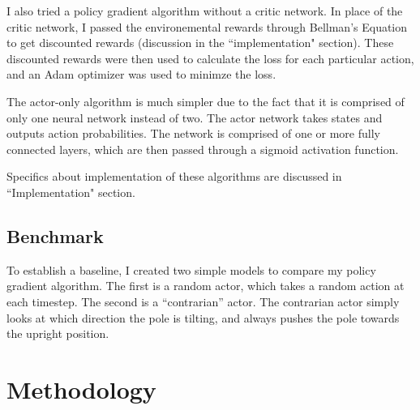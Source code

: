 \documentclass[12pt,a4paper]{article}
\begin{document}
I also tried a policy gradient algorithm without a critic network. In place of the critic network, I passed the environemental rewards through Bellman's Equation to get discounted rewards (discussion in the ``implementation" section). These discounted rewards were then used to calculate the loss for each particular action, and an Adam optimizer was used to minimze the loss.

The actor-only algorithm is much simpler due to the fact that it is comprised of only one neural network instead of two. The actor network takes states and outputs action probabilities. The network is comprised of one or more fully connected layers, which are then passed through a sigmoid activation function.

Specifics about implementation of these algorithms are discussed in ``Implementation" section.


\subsection*{Benchmark}
To establish a baseline, I created two simple models to compare my policy gradient algorithm. The first is a random actor, which takes a random action at each timestep. The second is a ``contrarian'' actor. The contrarian actor simply looks at which direction the pole is tilting, and always pushes the pole towards the upright position.

\section{Methodology}
%
\end{document}
